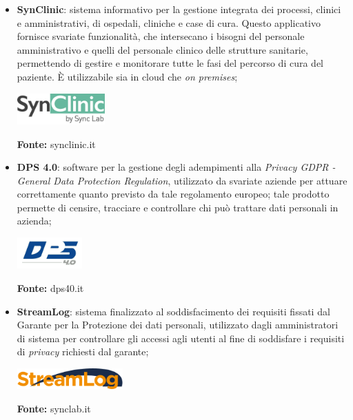 \begin{itemize}
  \item \textbf{SynClinic}: sistema informativo per la gestione integrata dei processi, clinici e amministrativi, di ospedali, cliniche e case di cura. Questo applicativo fornisce svariate funzionalità, che intersecano i bisogni del personale amministrativo e quelli del personale clinico delle strutture sanitarie, permettendo di gestire e monitorare tutte le fasi del percorso di cura del paziente. È utilizzabile sia in cloud che \textit{on premises};

  \begin{minipage}{\linewidth}
    \centering
      \includegraphics[height=1.2cm]{immagini/synclinic}
    \caption*{\textbf{Fonte:} synclinic.it}
  \end{minipage}

  \item \textbf{DPS 4.0}: software per la gestione degli adempimenti alla \textit{Privacy GDPR - General Data Protection Regulation}, utilizzato da svariate aziende per attuare correttamente quanto previsto da tale regolamento europeo; tale prodotto permette di censire, tracciare e controllare chi può trattare dati personali in azienda;

  \begin{minipage}{\linewidth}
    \centering
      \includegraphics[height=1.2cm]{immagini/dps40}
    \caption*{\textbf{Fonte:} dps40.it}
  \end{minipage}

  \item \textbf{StreamLog}: sistema finalizzato al soddisfacimento dei requisiti fissati dal Garante per la Protezione dei dati personali, utilizzato dagli amministratori di sistema per controllare gli accessi agli utenti al fine di soddisfare i requisiti di \textit{privacy} richiesti dal garante;

  \begin{minipage}{\linewidth}
    \centering
      \includegraphics[height=0.8cm]{immagini/streamlog}
    \caption*{\textbf{Fonte:} synclab.it}
  \end{minipage}


\end{itemize}
